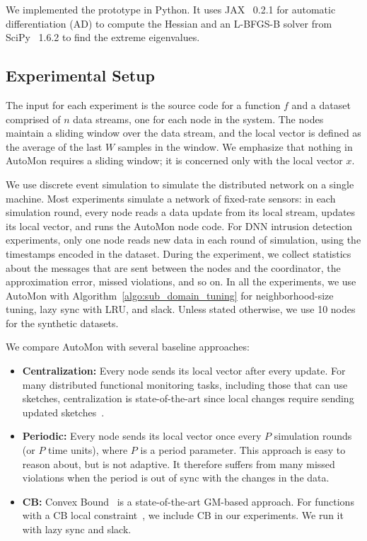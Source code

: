 We implemented the prototype in Python.
It uses JAX~\cite{jax2018github} 0.2.1 for automatic differentiation (AD) to compute the Hessian and an L-BFGS-B solver from SciPy~\cite{2020SciPy_NMeth} 1.6.2 to find the extreme eigenvalues.

\subsection{Experimental Setup}

The input for each experiment is the source code for a function $f$ and a dataset comprised of $n$ data streams, one for each node in the system.
The nodes maintain a sliding window over the data stream, and the local vector is defined as the average of the last $W$ samples in the window.
We emphasize that nothing in AutoMon requires a sliding window; it is concerned only with the local vector $x$.

We use discrete event simulation to simulate the distributed network on a single machine.
Most experiments simulate a network of fixed-rate sensors:
in each simulation round, every node reads a data update from its local stream, updates its local vector, and runs the AutoMon node code.
For DNN intrusion detection experiments, only one node reads new data in each round of simulation, using the timestamps encoded in the dataset.
During the experiment, we collect statistics about the messages that are sent between the nodes and the coordinator, the approximation error, missed violations, and so on.
%
In all the experiments, we use AutoMon with Algorithm~\ref{algo:sub_domain_tuning} for neighborhood-size tuning, lazy sync with LRU, and slack.
Unless stated otherwise, we use 10 nodes for the synthetic datasets.

We compare AutoMon with several baseline approaches:

\begin{itemize}[noitemsep, leftmargin=*]
\item \textbf{Centralization:} Every node sends its local vector after every update.
For many distributed functional monitoring tasks, including those that can use sketches, centralization is state-of-the-art since local changes require sending updated sketches~\cite{2021_icde_distance_lemma}.

\item \textbf{Periodic:} Every node sends its local vector once every $P$ simulation rounds (or $P$ time units), where $P$ is a period parameter.
This approach is easy to reason about, but is not adaptive.
It therefore suffers from many missed violations when the period is out of sync with the changes in the data.


\item \textbf{CB:} Convex Bound~\cite{lazerson:lightweight_monitoring} is a state-of-the-art GM-based approach.
For functions with a CB local constraint~\cite{lazerson:lightweight_monitoring}, we include CB in our experiments. 
We run it with lazy sync and slack.

\end{itemize}


